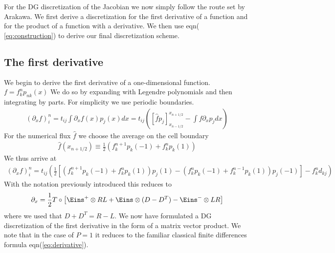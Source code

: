 \documentclass[a4paper,12pt]{scrartcl}
\begin{document}
For the DG discretization of the Jacobian we now simply follow the route set by
Arakawa. We first derive a discretization for the first derivative of a function
and for the product of a function with a derivative. We then use eqn( \ref{eq:construction}) to derive our final discretization scheme. 












\subsection{ The first derivative}
We begin to derive the first derivative of a one-dimensional function.
$ f = f^n_kp_{nk}(x)$
We do so
by expanding with Legendre polynomials and then integrating by parts. For 
simplicity we use periodic boundaries. 
\begin{align}
    (\partial_x f)^n_i = t_{ij}\int\partial_x f(x) p_j(x) dx = t_{ij}\left( [\hat f p_j]_{x_{n-1/2}}^{x_{n+1/2}} - \int f \partial_x p_j dx \right)
    \label{}
\end{align}
For the numerical flux $\hat f$ we choose the average on the cell boundary
\begin{align}
    \hat f(x_{n+1/2}) \equiv \frac{1}{2}(f^{n+1}_kp_k(-1) + f^n_k p_k(1))
    \label{}
\end{align}
We thus arrive at
\begin{align}
    (\partial_x f)^n_i= t_{ij}\left(  \frac{1}{2}[(f^{n+1}_kp_k(-1)+ f^n_kp_k(1))p_j(1) 
                - (f^n_kp_k(-1) + f^{n-1}_kp_k(1))p_j(-1)] - f^n_k d_{kj} \right)
    \label{}
\end{align}
With the notation previously introduced this reduces to 
\begin{align}
    \partial_x = \frac{1}{2}T\circ \left[ \Eins^+\otimes RL + \Eins \otimes (D-D^T) - \Eins^-\otimes LR\right]
    \label{}
\end{align}
where we used that $D+D^T = R-L$. We now have formulated a DG discretization of the first derivative in the form of a matrix vector product. 
We note that in the case of $P = 1$ it reduces to the familiar classical finite
differences formula eqn(\ref{eq:derivative}).
\end{document}
